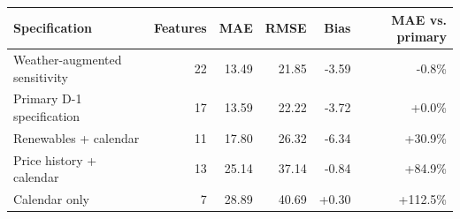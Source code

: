 \begin{tabular}{lrrrrr}
\toprule
Specification & Features & MAE & RMSE & Bias & MAE vs. primary \\
\midrule
Weather-augmented sensitivity & 22 & 13.49 & 21.85 & -3.59 & -0.8\% \\
Primary D-1 specification & 17 & 13.59 & 22.22 & -3.72 & +0.0\% \\
Renewables + calendar & 11 & 17.80 & 26.32 & -6.34 & +30.9\% \\
Price history + calendar & 13 & 25.14 & 37.14 & -0.84 & +84.9\% \\
Calendar only & 7 & 28.89 & 40.69 & +0.30 & +112.5\% \\
\bottomrule
\end{tabular}
